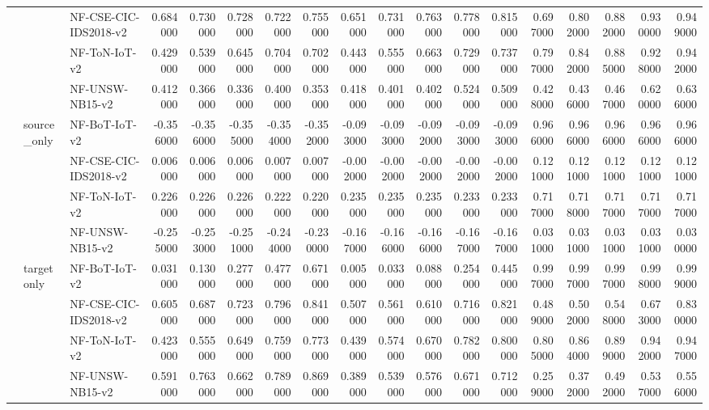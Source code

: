 \begin{tabular}{lllrrrrrrrrrrrrrrr}
 &  & NF-CSE-CIC-IDS2018-v2 & 0.684000 & 0.730000 & 0.728000 & 0.722000 & 0.755000 & 0.651000 & 0.731000 & 0.763000 & 0.778000 & 0.815000 & 0.697000 & 0.802000 & 0.882000 & 0.930000 & 0.949000 \\
 &  & NF-ToN-IoT-v2 & 0.429000 & 0.539000 & 0.645000 & 0.704000 & 0.702000 & 0.443000 & 0.555000 & 0.663000 & 0.729000 & 0.737000 & 0.797000 & 0.842000 & 0.885000 & 0.928000 & 0.942000 \\
 &  & NF-UNSW-NB15-v2 & 0.412000 & 0.366000 & 0.336000 & 0.400000 & 0.353000 & 0.418000 & 0.401000 & 0.402000 & 0.524000 & 0.509000 & 0.428000 & 0.436000 & 0.467000 & 0.620000 & 0.636000 \\
\cline{2-18}
 & \multirow[t]{4}{*}{source_only} & NF-BoT-IoT-v2 & -0.356000 & -0.356000 & -0.355000 & -0.354000 & -0.352000 & -0.093000 & -0.093000 & -0.092000 & -0.093000 & -0.093000 & 0.966000 & 0.966000 & 0.966000 & 0.966000 & 0.966000 \\
 &  & NF-CSE-CIC-IDS2018-v2 & 0.006000 & 0.006000 & 0.006000 & 0.007000 & 0.007000 & -0.002000 & -0.002000 & -0.002000 & -0.002000 & -0.002000 & 0.121000 & 0.121000 & 0.121000 & 0.121000 & 0.121000 \\
 &  & NF-ToN-IoT-v2 & 0.226000 & 0.226000 & 0.226000 & 0.222000 & 0.220000 & 0.235000 & 0.235000 & 0.235000 & 0.233000 & 0.233000 & 0.717000 & 0.718000 & 0.717000 & 0.717000 & 0.717000 \\
 &  & NF-UNSW-NB15-v2 & -0.255000 & -0.253000 & -0.251000 & -0.244000 & -0.230000 & -0.167000 & -0.166000 & -0.166000 & -0.167000 & -0.167000 & 0.031000 & 0.031000 & 0.031000 & 0.031000 & 0.030000 \\
\cline{2-18}
 & \multirow[t]{4}{*}{targetonly} & NF-BoT-IoT-v2 & 0.031000 & 0.130000 & 0.277000 & 0.477000 & 0.671000 & 0.005000 & 0.033000 & 0.088000 & 0.254000 & 0.445000 & 0.997000 & 0.997000 & 0.997000 & 0.998000 & 0.999000 \\
 &  & NF-CSE-CIC-IDS2018-v2 & 0.605000 & 0.687000 & 0.723000 & 0.796000 & 0.841000 & 0.507000 & 0.561000 & 0.610000 & 0.716000 & 0.821000 & 0.489000 & 0.502000 & 0.548000 & 0.673000 & 0.830000 \\
 &  & NF-ToN-IoT-v2 & 0.423000 & 0.555000 & 0.649000 & 0.759000 & 0.773000 & 0.439000 & 0.574000 & 0.670000 & 0.782000 & 0.800000 & 0.805000 & 0.864000 & 0.899000 & 0.942000 & 0.947000 \\
 &  & NF-UNSW-NB15-v2 & 0.591000 & 0.763000 & 0.662000 & 0.789000 & 0.869000 & 0.389000 & 0.539000 & 0.576000 & 0.671000 & 0.712000 & 0.259000 & 0.372000 & 0.492000 & 0.537000 & 0.556000 \\

\end{tabular}
